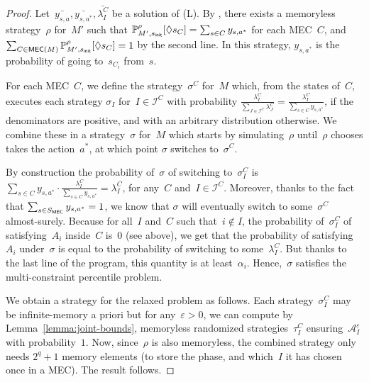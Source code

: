 \documentclass{llncs}
\newcommand{\initState}{\ensuremath{s_{{\sf init}}} }
\newcommand*{\pr}{\mathbb{P}}
\newcommand\calI{\ensuremath{\mathcal{I}}}
\newcommand\calA{\ensuremath{\mathcal{A}}}
\newcommand\mecs{\ensuremath{\textrm{\sf MEC}}}
\begin{document}
  
\begin{proof}
  Let~$\bar{y_{s,a}},\bar{y_{s,a^*}}, \bar{\lambda_I^C}$ be a solution of (L).
  By \cite[Theorem 3.2]{EKVY-lmcs08}, there exists a memoryless strategy~$\rho$ for~$M'$ such that
  $\pr_{M',\initState}^\rho[\Diamond s_{C}] = \sum_{s \in C} y_{s,a^*}$ for each MEC~$C$,
  and $\sum_{C \in \mecs(M)} \pr_{M',\initState}^\rho[\Diamond s_{C}] = 1$ by the second line.  
  In this strategy, $y_{s,a^*}$ is the probability of going to~$s_{C_i}$ from~$s$.

  For each MEC~$C$, we define the strategy~$\sigma^C$ for~$M$ which, from the states of~$C$,
  executes each strategy
  $\sigma_I$ for~$I \in \calI^C$ with probability $\frac{\lambda_I^C}{\sum_{J \in
      \calI^C}\lambda_J^C}=\frac{\lambda_I^C}{\sum_{s \in C} y_{s,a^*}}$,
  if the denominators are positive, and with an arbitrary distribution otherwise.
  We combine these in a strategy~$\sigma$ for~$M$
  which starts by simulating~$\rho$ until~$\rho$ chooses takes the action~$a^*$, at which point
  $\sigma$ switches to~$\sigma^C$.

  By construction the probability of~$\sigma$ of switching to~$\sigma_I^C$ is
  $\sum_{s \in C}y_{s,a^*} \cdot \frac{\lambda_I^C}{\sum_{s \in C}y_{s,a^*}} = \lambda^C_I$, for any~$C$ and~$I \in \calI^C$.
  Moreover, thanks to the fact that $\sum_{s \in S_{\mecs}} y_{s,a^*} =1$, we know that $\sigma$ will eventually switch to some~$\sigma^C$ almost-surely. 
  Because for all~$I$ and~$C$ such that~$i \not \in I$, the probability of~$\sigma_I^C$ of satisfying~$A_i$ inside~$C$ is~$0$ (see above), 
  we get that the probability of satisfying~$A_i$ under~$\sigma$ is equal to the probability of switching to some~$\lambda^C_I$.
  But thanks to the last line of the program, this quantity is at least~$\alpha_i$.
  Hence,~$\sigma$ satisfies the multi-constraint percentile problem.

  We obtain a strategy for the relaxed problem as follows. Each strategy~$\sigma_I^C$ may be infinite-memory a priori
  but for any~$\varepsilon>0$, we can compute by Lemma~\ref{lemma:joint-bounds}, memoryless randomized strategies~$\tau_I^C$ ensuring~$\calA_I^\varepsilon$
  with probability~$1$. Now, since~$\rho$ is also memoryless, the combined strategy only needs $2^q+1$ memory elements (to store the phase, and which~$I$ it has chosen once in a MEC).
  The result follows.
\end{proof}
\end{document}
